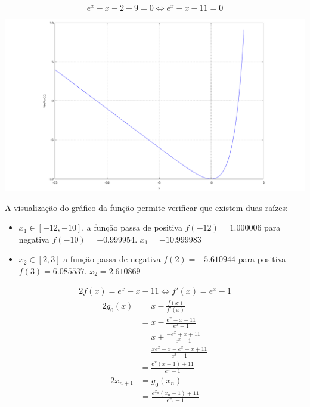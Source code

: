 \setcounter{chapter}{18}

\begin{equation*}
	e^x-x-2-9=0 \iff e^x-x-11=0
\end{equation*}

\begin{center} \includegraphics[scale=0.32]{2019T1_1a} \end{center}
A visualização do gráfico da função permite verificar que existem duas raízes:
\begin{itemize}
	\item $x_1 \in [-12,-10]$, a função passa de positiva $f(-12)=1.000006$ para negativa $f(-10)=-0.999954$. $x_1 = -10.999983$
	\item $x_2 \in [2,3]$ a função passa de negativa $f(2)=- 5.610944$ para positiva $f(3)=6.085537$. $x_2=2.610869$
\end{itemize}

\begin{alignat*}{2}
f(x)=e^x-x-11 \iff f'(x)=e^x-1
\end{alignat*}
\begin{alignat*}{2}
g_0(x)
&=x-\frac{f(x)}{f'(x)} \\
&=x-\frac{e^x-x-11}{e^x-1}\\
&=x+\frac{-e^x+x+11}{e^x-1}\\
&=\frac{xe^x-x-e^x+x+11}{e^x-1}\\
&=\frac{e^x(x-1)+11}{e^x-1}
\end{alignat*}
\begin{alignat*}{2}
x_{n+1}
&=g_0(x_n) \\
&=\frac{e^{x_n}(x_n-1)+11}{e^{x_n}-1}
\end{alignat*}


